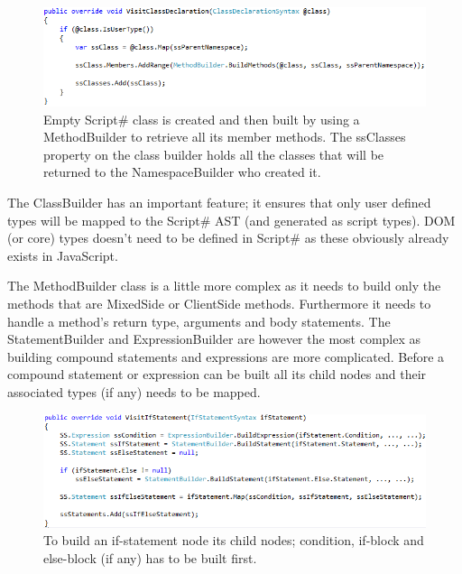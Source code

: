 	\begin{figure}[H]
		\begin{center}
			\centerline{\includegraphics[width=16cm]{resources/images/VisitClassDeclaration.png}}
		\end{center}
		\caption{Empty Script\# class is created and then built by using a MethodBuilder to retrieve all its member methods. The ssClasses property on the class builder holds all the classes that will be returned to the NamespaceBuilder who created it.}
		\label{visitClassDeclaration}
	\end{figure}

	The ClassBuilder has an important feature; it ensures that only user defined types will be mapped to the Script\# AST (and generated as script types). DOM (or core) types doesn't need to be defined in Script\# as these obviously already exists in JavaScript.

	The MethodBuilder class is a little more complex as it needs to build only the methods that are MixedSide or ClientSide methods. Furthermore it needs to handle a method’s return type, arguments and body statements. The StatementBuilder and ExpressionBuilder are however the most complex as building compound statements and expressions are more complicated. Before a compound statement or expression can be built all its child nodes and their associated types (if any) needs to be mapped.

	\begin{figure}[H]
		\begin{center}
			\centerline{\includegraphics[width=16cm]{resources/images/VisitIfStatement.png}}
		\end{center}
		\caption{To build an if-statement node its child nodes; condition, if-block and else-block (if any) has to be built first.}
		\label{visitIfStatement}
	\end{figure}

